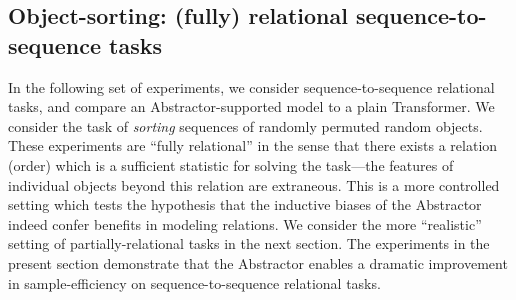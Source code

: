 \subsection{Object-sorting: (fully) relational sequence-to-sequence tasks}\label{ssec:experiments_object_sorting}

In the following set of experiments, we consider sequence-to-sequence relational tasks, and compare an Abstractor-supported model to a plain Transformer. We consider the task of \textit{sorting} sequences of randomly permuted random objects. These experiments are ``fully relational'' in the sense that there exists a relation (order) which is a sufficient statistic for solving the task---the features of individual objects beyond this relation are extraneous. This is a more controlled setting which tests the hypothesis that the inductive biases of the Abstractor indeed confer benefits in modeling relations. We consider the more ``realistic'' setting of partially-relational tasks in the next section. The experiments in the present section demonstrate that the Abstractor enables a dramatic improvement in sample-efficiency on sequence-to-sequence relational tasks.


